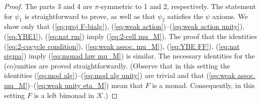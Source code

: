 \documentclass[a4paper, 12pt]{article}
\renewcommand{\_}[1]{\mbox{$_{\left( #1 \right)}$}}
\theoremstyle{plain}
\def\K{{\mathcal K}}  %
\newcommand{\equref}[1]{(\ref{eq:#1})}
\begin{document}
\begin{proof}
The parts 3 and 4 are $\pi$-symmetric to 1 and 2, respectively. The statement for $\psi_1$ is straightforward to prove, as well as that $\psi_2$ satisfies the $\psi$ axioms. We show only that 
\equref{proj F-bialg}, \equref{weak action}--\equref{weak action unity}, \equref{YBE1}, \equref{nat rm} imply \equref{2-cell mu_M}. The proof that the identities 
\equref{2-cocycle condition}, \equref{weak assoc. mu_M}, \equref{YBE FF}, \equref{nat sigma} imply \equref{monad law mu_M} is similar. The necessary identities 
for the (co)unities are proved straightforwardly. (Observe that in this setting the identities \equref{mod alg}--\equref{mod alg unity} are trivial and that 
\equref{weak assoc. mu_M}--\equref{weak unity eta_M} mean that $F$ is a monad. Consequently, in this setting $F$ is a left bimonad in $\K$.) 


\end{proof}
\end{document}
